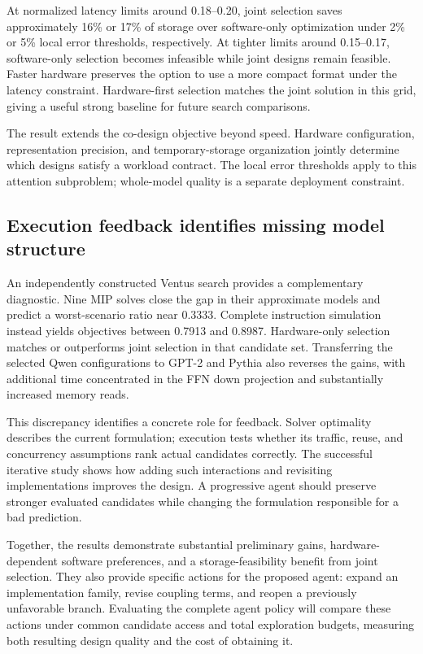 At normalized latency limits around 0.18--0.20, joint selection saves approximately 16\% or 17\% of storage over software-only optimization under 2\% or 5\% local error thresholds, respectively. At tighter limits around 0.15--0.17, software-only selection becomes infeasible while joint designs remain feasible. Faster hardware preserves the option to use a more compact format under the latency constraint. Hardware-first selection matches the joint solution in this grid, giving a useful strong baseline for future search comparisons.

The result extends the co-design objective beyond speed. Hardware configuration, representation precision, and temporary-storage organization jointly determine which designs satisfy a workload contract. The local error thresholds apply to this attention subproblem; whole-model quality is a separate deployment constraint.

\subsection{Execution feedback identifies missing model structure}\label{sec:model-results}
An independently constructed Ventus search provides a complementary diagnostic. Nine MIP solves close the gap in their approximate models and predict a worst-scenario ratio near 0.3333. Complete instruction simulation instead yields objectives between 0.7913 and 0.8987. Hardware-only selection matches or outperforms joint selection in that candidate set. Transferring the selected Qwen configurations to GPT-2 and Pythia also reverses the gains, with additional time concentrated in the FFN down projection and substantially increased memory reads.

This discrepancy identifies a concrete role for feedback. Solver optimality describes the current formulation; execution tests whether its traffic, reuse, and concurrency assumptions rank actual candidates correctly. The successful iterative study shows how adding such interactions and revisiting implementations improves the design. A progressive agent should preserve stronger evaluated candidates while changing the formulation responsible for a bad prediction.

Together, the results demonstrate substantial preliminary gains, hardware-dependent software preferences, and a storage-feasibility benefit from joint selection. They also provide specific actions for the proposed agent: expand an implementation family, revise coupling terms, and reopen a previously unfavorable branch. Evaluating the complete agent policy will compare these actions under common candidate access and total exploration budgets, measuring both resulting design quality and the cost of obtaining it.
